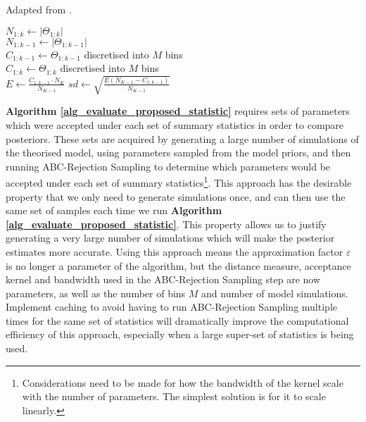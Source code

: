 \documentclass[11pt,a4paper]{article}
\theoremstyle{break}
\begin{document}
  \begin{box_algorithm}\label{alg_evaluate_proposed_statistic}
    Adapted from \cite[]{Approximately_sufficient_statistics_and_bayesian_computation}.
    \begin{algorithm}[H]
      $N_{1:k}\leftarrow\left|\Theta_{1:k}\right|$\\
      $N_{1:k-1}\leftarrow\left|\Theta_{1:k-1}\right|$\\
      $C_{1:k-1}\leftarrow\Theta_{1:k-1}$ discretised into $M$ bins\\
      $C_{1:k}\leftarrow\Theta_{1:k}$ discretised into $M$ bins\\
      $E\leftarrow\displaystyle\frac{C_{1:k-1}\cdot N_K}{N_{K-1}}$\label{alg_expected_value}
      $sd\leftarrow\displaystyle\sqrt{\frac{E(N_{K-1}-C_{1:k-1})}{N_{K-1}}}$\label{alg_standard_deviation}
       { \label{alg_line_condition}
      } 
    \end{algorithm}
  \end{box_algorithm}

  \par \textbf{Algorithm \ref{alg_evaluate_proposed_statistic}} requires sets of parameters which were accepted under each set of summary statistics in order to compare posteriors. These sets are acquired by generating a large number of simulations of the theorised model, using parameters sampled from the model priors, and then running ABC-Rejection Sampling to determine which parameters would be accepted under each set of summary statistics\footnote{Considerations need to be made for how the bandwidth of the kernel scale with the number of parameters. The simplest solution is for it to scale linearly.}. This approach has the desirable property that we only need to generate simulations once, and can then use the same set of samples each time we run \textbf{Algorithm \ref{alg_evaluate_proposed_statistic}}. This property allows us to justify generating a very large number of simulations which will make the posterior estimates more accurate. Using this approach means the approximation factor $\varepsilon$ is no longer a parameter of the algorithm, but the distance measure, acceptance kernel and bandwidth used in the ABC-Rejection Sampling step are now parameters, as well as the number of bins $M$ and number of model simulations. Implement caching to avoid having to run ABC-Rejection Sampling multiple times for the same set of statistics will dramatically improve the computational efficiency of this approach, especially when a large super-set of statistics is being used.
\end{document}
